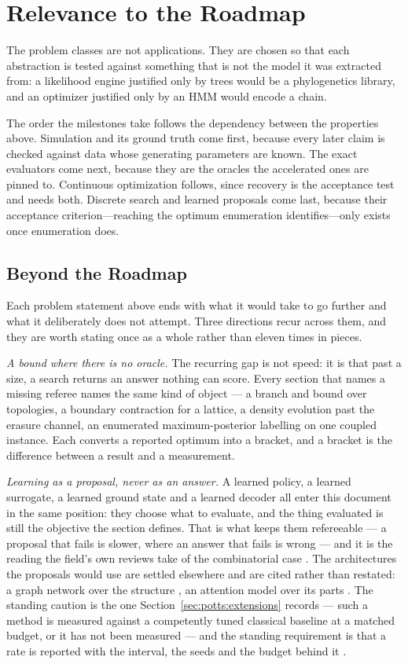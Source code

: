 \documentclass[11pt,a4paper]{article}
\begin{document}
\section{Relevance to the Roadmap}
\label{sec:roadmap}

The problem classes are not applications. They are chosen so that
each abstraction is tested against something that is not the model it was
extracted from: a likelihood engine justified only by trees would be a
phylogenetics library, and an optimizer justified only by an HMM would
encode a chain.

The order the milestones take follows the dependency between the properties
above. Simulation and its ground truth come first, because every later claim is
checked against data whose generating parameters are known. The exact
evaluators come next, because they are the oracles the accelerated ones are
pinned to. Continuous optimization follows, since recovery is the acceptance
test and needs both. Discrete search and learned proposals come last, because
their acceptance criterion---reaching the optimum enumeration identifies---only
exists once enumeration does.

\subsection{Beyond the Roadmap}
\label{sec:bluesky}
Each problem statement above ends with what it would take to go further and
what it deliberately does not attempt. Three directions recur across them, and
they are worth stating once as a whole rather than eleven times in pieces.

\emph{A bound where there is no oracle.} The recurring gap is not speed: it is
that past a size, a search returns an answer nothing can score. Every section
that names a missing referee names the same kind of object --- a branch and
bound over topologies, a boundary contraction for a lattice, a density
evolution past the erasure channel, an enumerated maximum-posterior labelling
on one coupled instance. Each converts a reported optimum into a bracket, and
a bracket is the difference between a result and a measurement.

\emph{Learning as a proposal, never as an answer.} A learned policy, a learned
surrogate, a learned ground state and a learned decoder all enter this
document in the same position: they choose what to evaluate, and the thing
evaluated is still the objective the section defines. That is what keeps them
refereeable --- a proposal that fails is slower, where an answer that fails is
wrong --- and it is the reading the field's own reviews take of the
combinatorial case \citep{bengio2021, mazyavkina2021}. The architectures the
proposals would use are settled elsewhere and are cited rather than restated:
a graph network over the structure \citep{khalil2017}, an attention model over
its parts \citep{kool2019}. The standing caution is the one
Section~\ref{sec:potts:extensions} records --- such a method is measured
against a competently tuned classical baseline at a matched budget, or it has
not been measured \citep{angelini2023} --- and the standing requirement is
that a rate is reported with the interval, the seeds and the budget behind it
\citep{henderson2018, agarwal2021}.
\end{document}
